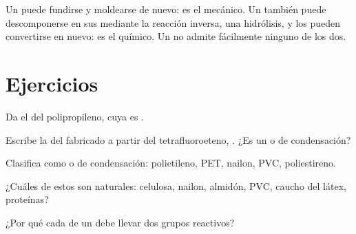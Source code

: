 \begin{remark}\label{rem:g12:polymers:recycling}
Un  puede fundirse y moldearse de nuevo: es el 
mecánico. Un  también puede descomponerse en sus
 mediante la reacción inversa, una hidrólisis, y los 
pueden convertirse en  nuevo: es el  químico. Un
 no admite fácilmente ninguno de los dos.
\end{remark}

\section{Ejercicios}

\begin{exercise}[$\star$]\label{exo:g12:polymers:1}
Da el  del polipropileno, cuya  es
.
\end{exercise}

\begin{exercise}[$\star$]\label{exo:g12:polymers:2}
Escribe la  del  fabricado a partir del
tetrafluoroeteno, . ¿Es un  o de
condensación?
\end{exercise}

\begin{exercise}[$\star$]\label{exo:g12:polymers:3}
Clasifica como  o de condensación: polietileno, PET,
nailon, PVC, poliestireno.
\end{exercise}

\begin{exercise}[$\star$]\label{exo:g12:polymers:4}
¿Cuáles de estos  son naturales: celulosa, nailon, almidón, PVC,
caucho del látex, proteínas?
\end{exercise}

\begin{exercise}[$\star$]\label{exo:g12:polymers:5}
¿Por qué cada  de un  debe llevar dos
grupos reactivos?
\end{exercise}

